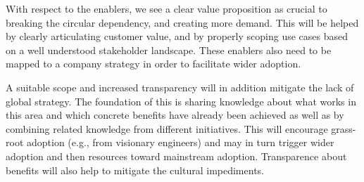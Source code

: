 With respect to the enablers, we see a clear value proposition as crucial to breaking the circular dependency, and creating more demand. This will be helped by clearly articulating customer value, and by properly scoping use cases based on a well understood stakeholder landscape. These enablers also need to be mapped to a company strategy in order to facilitate wider adoption. 

A suitable scope and increased transparency will in addition mitigate the lack of global strategy. The foundation of this is sharing knowledge about what works in this area and which concrete benefits have already been achieved as well as by combining related knowledge from different initiatives. This will encourage grass-root adoption (e.g., from visionary engineers) and may in turn trigger wider adoption and then resources toward mainstream adoption. Transparence about benefits will also help to mitigate the cultural impediments.

